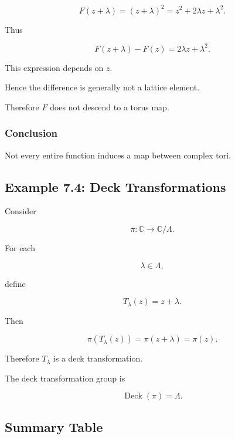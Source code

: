 \documentclass[12pt,a4paper]{article}
\theoremstyle{notespace}
\begin{document}
\[
F(z+\lambda)
=
(z+\lambda)^2
=
z^2+2\lambda z+\lambda^2.
\]

Thus

\[
F(z+\lambda)-F(z)
=
2\lambda z+\lambda^2.
\]

This expression depends on \(z\).

Hence the difference is generally not a lattice element.

Therefore \(F\) does not descend to a torus map.

\subsubsection*{Conclusion}

Not every entire function induces a map between complex tori.

\subsection{Example 7.4: Deck Transformations}

Consider

\[
\pi:\mathbb C\to\mathbb C/\Lambda.
\]

For each

\[
\lambda\in\Lambda,
\]

define

\[
T_\lambda(z)
=
z+\lambda.
\]

Then

\[
\pi(T_\lambda(z))
=
\pi(z+\lambda)
=
\pi(z).
\]

Therefore \(T_\lambda\) is a deck transformation.

The deck transformation group is

\[
\operatorname{Deck}(\pi)
=
\Lambda.
\]

\subsection{Summary Table}
\end{document}
